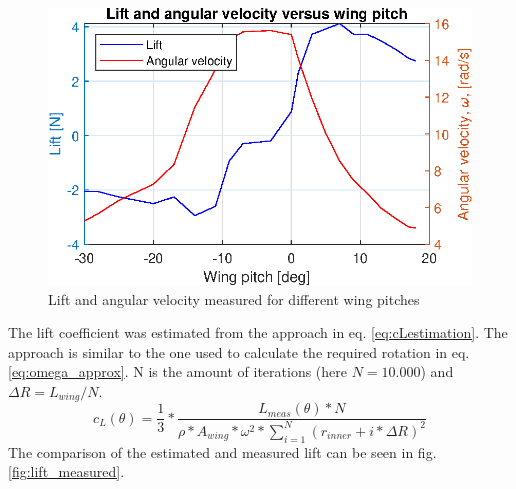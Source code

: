 \begin{figure}[h]
    \centering
    \includegraphics{figures/results/lift_rotation_measured.eps}
    \caption{Lift and angular velocity measured for different wing pitches}
    \label{fig:lift_omega_measured}
\end{figure}

The lift coefficient was estimated from the approach in eq. \ref{eq:cLestimation}. The approach is similar to the one used to calculate the required rotation in eq. \ref{eq:omega_approx}. N is the amount of iterations (here $N=10.000$) and $\Delta R = L_{wing}/N$.
\begin{equation}
\label{eq:cLestimation}
    c_L(\theta) = \frac{1}{3} * \frac{L_{meas}(\theta)*N}{\rho*A_{wing}*\omega^2*\sum_{i=1}^{N} (r_{inner}+ i*\Delta R)^2}
\end{equation}
The comparison of the estimated and measured lift can be seen in fig. \ref{fig:lift_measured}.\\

